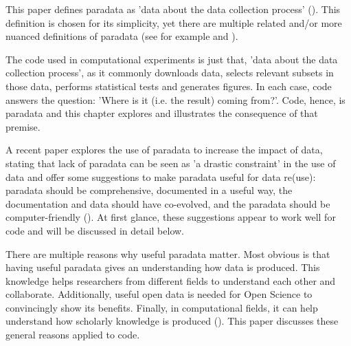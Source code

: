
This paper defines paradata as 'data about the data collection 
process' (\cite{choumert2019using}).
This definition is chosen for its simplicity, 
yet there are multiple related and/or more nuanced 
definitions of paradata (see for example \cite{huvila2022improving} 
and \cite{skold2022interrogating}).


The code used in computational experiments is just that, 
'data about the data collection 
process', as it commonly downloads data,
selects relevant subsets in those data,
performs statistical tests and generates figures.
In each case, code answers the question: 
'Where is it (i.e. the result) coming from?'.
Code, hence, is paradata and this chapter explores and illustrates the
consequence of that premise.


A recent paper explores the use of paradata to increase the impact of data,
stating that lack of paradata can be seen as 'a drastic constraint'
in the use of data and offer some suggestions to 
make paradata useful for data re(use):
paradata should be comprehensive, documented in a useful way, 
the documentation and data should have co-evolved, 
and the paradata should be computer-friendly (\cite{huvila2022improving}).
At first glance, these suggestions appear to work well for code
and will be discussed in detail below.


There are multiple reasons why useful paradata matter. 
Most obvious is that having useful paradata gives an understanding how
data is produced.
This knowledge helps researchers from different fields to understand each other
and collaborate.
Additionally, useful open data is needed for Open Science to convincingly show
its benefits.
Finally, in computational fields, 
it can help understand how scholarly knowledge is produced (\cite{huvila2022improving}).
This paper discusses these general reasons applied to code.

